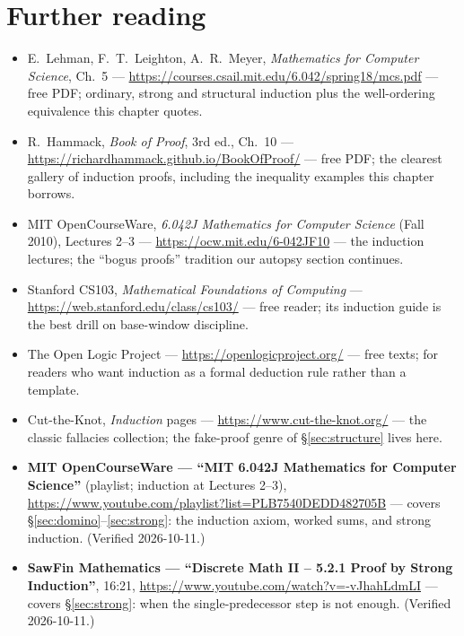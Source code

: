 \section*{Further reading}
\begin{itemize}
\item E.~Lehman, F.~T.~Leighton, A.~R.~Meyer, \emph{Mathematics for Computer
Science}, Ch.~5 ---
\url{https://courses.csail.mit.edu/6.042/spring18/mcs.pdf} --- free PDF;
ordinary, strong and structural induction plus the well-ordering
equivalence this chapter quotes.
\item R.~Hammack, \emph{Book of Proof}, 3rd ed., Ch.~10 ---
\url{https://richardhammack.github.io/BookOfProof/} --- free PDF; the
clearest gallery of induction proofs, including the inequality examples
this chapter borrows.
\item MIT OpenCourseWare, \emph{6.042J Mathematics for Computer Science}
(Fall 2010), Lectures 2--3 ---
\url{https://ocw.mit.edu/6-042JF10} --- the induction lectures;
the ``bogus proofs'' tradition our autopsy section continues.
\item Stanford CS103, \emph{Mathematical Foundations of Computing} ---
\url{https://web.stanford.edu/class/cs103/} --- free reader; its induction
guide is the best drill on base-window discipline.
\item The Open Logic Project ---
\url{https://openlogicproject.org/} --- free texts; for readers who want
induction as a formal deduction rule rather than a template.
\item Cut-the-Knot, \emph{Induction} pages ---
\url{https://www.cut-the-knot.org/} --- the classic fallacies collection;
the fake-proof genre of \S\ref{sec:structure} lives here.
\end{itemize}

\begin{rulebox}
\begin{itemize}
\item \textbf{MIT OpenCourseWare --- ``MIT 6.042J Mathematics for Computer
Science''} (playlist; induction at Lectures 2--3),
\url{https://www.youtube.com/playlist?list=PLB7540DEDD482705B} ---
covers \S\ref{sec:domino}--\ref{sec:strong}: the induction axiom,
worked sums, and strong induction. (Verified 2026-10-11.)
\item \textbf{SawFin Mathematics --- ``Discrete Math II -- 5.2.1 Proof by
Strong Induction''}, 16:21,
\url{https://www.youtube.com/watch?v=-vJhahLdmLI} --- covers
\S\ref{sec:strong}: when the single-predecessor step is not enough.
(Verified 2026-10-11.)
\end{itemize}
\end{rulebox}

